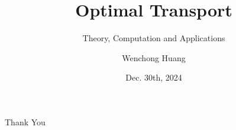 \documentclass[10pt]{beamer}
\author{Wenchong Huang}
\title{Optimal Transport}
\subtitle{Theory, Computation and Applications}
\institute{
    School of Mathematical Sciences, \\
    Zhejiang University.
}
\date{Dec. 30th, 2024}
\begin{document}
\begin{frame}
    \titlepage
\end{frame}









\begin{frame}
    \begin{center}
        {\Huge\calligra Thank You}
    \end{center}
\end{frame}
\end{document}
